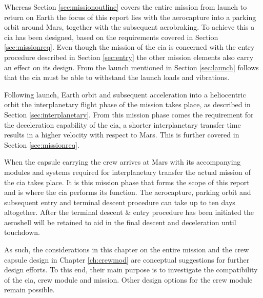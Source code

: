 Whereas Section \ref{sec:missionoutline} covers the entire mission from launch to return on Earth the focus of this report lies with the aerocapture into a parking orbit around Mars, together with the subsequent aerobraking. To achieve this a \gls{cia} has been designed, based on the requirements covered in Section \ref{sec:missionreq}. Even though the mission of the \gls{cia} is concerned with the entry procedure described in Section \ref{sec:entry} the other mission elements also carry an effect on its design. From the launch mentioned in Section \ref{sec:launch} follows that the \gls{cia} must be able to withstand the launch loads and vibrations. 

Following launch, Earth orbit and subsequent acceleration into a heliocentric orbit the interplanetary flight phase of the mission takes place, as described in Section \ref{sec:interplanetary}. From this mission phase comes the requirement for the deceleration capability of the \gls{cia}, a shorter interplanetary transfer time results in a higher velocity with respect to Mars. This is further covered in Section \ref{sec:missionreq}. 

When the capsule carrying the crew arrives at Mars with its accompanying modules and systems required for interplanetary transfer the actual mission of the \gls{cia} takes place. It is this mission phase that forms the scope of this report and is where the \gls{cia} performs its function. The aerocapture, parking orbit and subsequent entry and terminal descent procedure can take up to ten days altogether. After the terminal descent \& entry procedure has been initiated the aeroshell will be retained to aid in the final descent and deceleration until touchdown.

As such, the considerations in this chapter on the entire mission and the crew capsule design in Chapter \ref{ch:crewmod} are conceptual suggestions for further design efforts. To this end, their main purpose is to investigate the compatibility of the \gls{cia}, crew module and mission. Other design options for the crew module remain possible.
